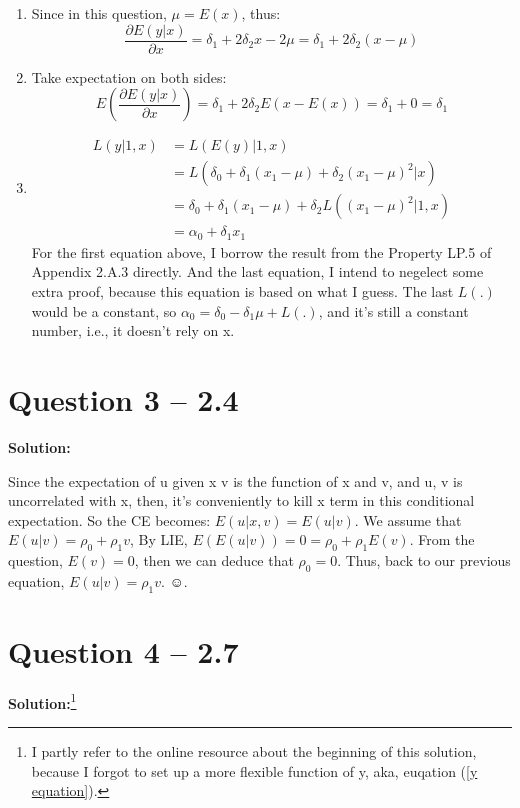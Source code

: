 \documentclass[11pt]{article} %
\begin{document}
\begin{enumerate}
    \item Since in this question, $\mu = E(x)$, thus:
    \begin{equation*}
        \frac{\partial E(y|x)}{\partial x}=\delta_1+2\delta_2x-2\mu=\delta_1+2\delta_2(x-\mu)
    \end{equation*}
    \item Take expectation on both sides:
    \begin{equation*}
        E(\frac{\partial E(y|x)}{\partial x})=\delta_1+2\delta_2E(x-E(x))=\delta_1+0=\delta_1
    \end{equation*}
    \item 
    \begin{align*}
        L(y|1,x)&=L(E(y)|1,x)\\
        &=L(\delta_0+\delta_1(x_1-\mu)+\delta_2(x_1-\mu)^2|x)\\
        &=\delta_0+\delta_1(x_1-\mu)+\delta_2L((x_1-\mu)^2|1,x)\\
        &= \alpha_0+\delta_1x_1
    \end{align*}
    For the first equation above, I borrow the result from the Property LP.5 of Appendix 2.A.3 directly. And the last equation, I intend to negelect
     some extra proof, because this equation is based on what I guess. The last $L(.)$ would be a constant, 
     so $\alpha_0= \delta_0-\delta_1 \mu + L(.)$, and it's still a constant number, i.e., it doesn't rely on x. 
\end{enumerate}

\section{Question 3 -- 2.4}
\textbf{Solution:}

Since the expectation of u given x v is the function of x and v, and u, v is uncorrelated with x, then, it's conveniently to kill x term in this conditional expectation.
So the CE becomes: $E(u|x,v)=E(u|v)$.
We assume that $E(u|v)=\rho_0+\rho_1v$, By LIE, $E(E(u|v))=0=\rho_0+\rho_1E(v)$. From the question, $E(v)=0$, then we can deduce that $\rho_0=0$. Thus, 
back to our previous equation, $E(u|v)=\rho_1v$. $\smiley$.

\section{Question 4 -- 2.7}
\textbf{Solution:}\footnote{I partly refer to the online resource about the beginning of this solution, because
I forgot to set up a more flexible function of y, aka, euqation (\ref{y equation}).}
\end{document}
